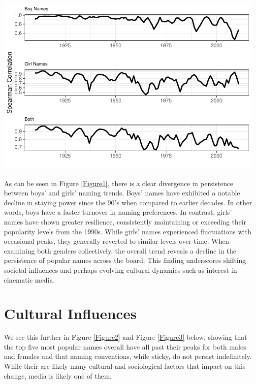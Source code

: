 \documentclass[11pt,preprint, authoryear]{elsarticle}
\let\origfigure\figure
\let\endorigfigure\endfigure
\renewenvironment{figure}[1][2] {
    \expandafter\origfigure\expandafter[H]
} {
    \endorigfigure
}
\numberwithin{equation}{section}
\numberwithin{figure}{section}
\numberwithin{table}{section}
\begin{document}
\begin{figure}[H]

{\centering \includegraphics{Question1_files/figure-latex/Figure1-1} 

}

\caption{Spearman Correlations Over Time.\label{Figure1}}\label{fig:Figure1}
\end{figure}

As can be seen in Figure \ref{Figure1}, there is a clear divergence in
persistence between boys' and girls' naming trends. Boys' names have
exhibited a notable decline in staying power since the 90's when
compared to earlier decades. In other words, boys have a faster turnover
in naming preferences. In contrast, girls' names have shown greater
resilience, consistently maintaining or exceeding their popularity
levels from the 1990s. While girls' names experienced fluctuations with
occasional peaks, they generally reverted to similar levels over time.
When examining both genders collectively, the overall trend reveals a
decline in the persistence of popular names across the board. This
finding underscores shifting societal influences and perhaps evolving
cultural dynamics such as interest in cinematic media.

\section{Cultural Influences}\label{cultural-influences}

We see this further in Figure \ref{Figure2} and Figure \ref{Figure3}
below, showing that the top five most popular names overall have all
past their peaks for both males and females and that naming conventions,
while sticky, do not persist indefinitely. While their are likely many
cultural and sociological factors that impact on this change, media is
likely one of them.
\end{document}
